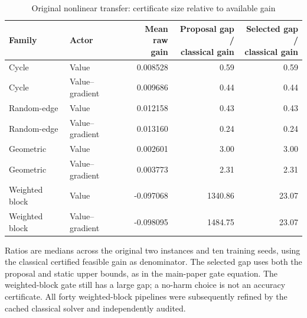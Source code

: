 \begin{table}[p]\centering
\caption{Original nonlinear transfer: certificate size relative to available gain}\label{tab:r12-ratios}
\setlength{\tabcolsep}{3.5pt}\begin{tabular}{llrrr}
\toprule
Family & Actor & \shortstack{Mean raw\\gain} & \shortstack{Proposal gap /\\classical gain} & \shortstack{Selected gap /\\classical gain} \\
\midrule
Cycle & Value & 0.008528 & 0.59 & 0.59 \\
Cycle & Value--gradient & 0.009686 & 0.44 & 0.44 \\
Random-edge & Value & 0.012158 & 0.43 & 0.43 \\
Random-edge & Value--gradient & 0.013160 & 0.24 & 0.24 \\
Geometric & Value & 0.002601 & 3.00 & 3.00 \\
Geometric & Value--gradient & 0.003773 & 2.31 & 2.31 \\
Weighted block & Value & -0.097068 & 1340.86 & 23.07 \\
Weighted block & Value--gradient & -0.098095 & 1484.75 & 23.07 \\
\bottomrule
\end{tabular}
\begin{minipage}{.98\textwidth}\small
Ratios are medians across the original two instances and ten training seeds, using the classical certified feasible gain as denominator. The selected gap uses both the proposal and static upper bounds, as in the main-paper gate equation. The weighted-block gate still has a large gap; a no-harm choice is not an accuracy certificate. All forty weighted-block pipelines were subsequently refined by the cached classical solver and independently audited.
\end{minipage}
\end{table}
